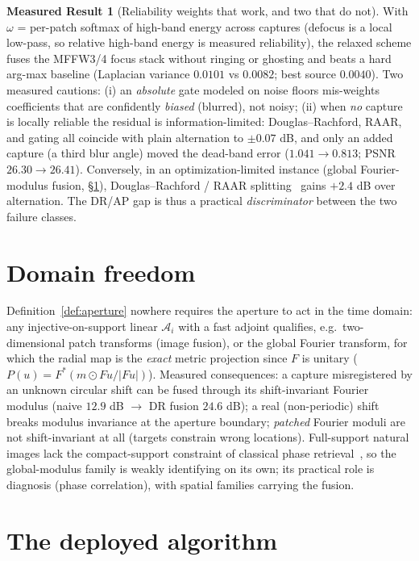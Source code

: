 \documentclass[11pt]{article}
\theoremstyle{definition}
\newtheorem{measured}[theorem]{Measured Result}
\newcommand{\cA}{\mathcal{A}}
\newcommand{\abs}[1]{\lvert #1\rvert}
\begin{document}
\begin{measured}[Reliability weights that work, and two that do not]
With $\omega$ = per-patch softmax of high-band energy across captures
(defocus is a local low-pass, so relative high-band energy is measured
reliability), the relaxed scheme fuses the MFFW3/4 focus stack without
ringing or ghosting and beats a hard arg-max baseline
(Laplacian variance $0.0101$ vs $0.0082$; best source $0.0040$).
Two measured cautions: (i) an \emph{absolute} gate modeled on noise floors
mis-weights coefficients that are confidently \emph{biased} (blurred), not
noisy; (ii) when \emph{no} capture is locally reliable the residual is
information-limited: Douglas--Rachford, RAAR, and gating all coincide with
plain alternation to $\pm0.07$ dB, and only an added capture (a third blur
angle) moved the dead-band error ($1.041\to0.813$; PSNR $26.30\to26.41$).
Conversely, in an optimization-limited instance (global Fourier-modulus
fusion, \S\ref{sec:domains}), Douglas--Rachford / RAAR
splitting~\cite{luke2005} gains $+2.4$ dB over alternation.  The DR/AP gap
is thus a practical \emph{discriminator} between the two failure classes.
\end{measured}

\section{Domain freedom}\label{sec:domains}

Definition~\ref{def:aperture} nowhere requires the aperture to act in the
time domain: any injective-on-support linear $\cA_i$ with a fast adjoint
qualifies, e.g.\ two-dimensional patch transforms (image fusion), or the
global Fourier transform, for which the radial map is the \emph{exact}
metric projection since $F$ is unitary
($P(u)=F^{*}(m\odot Fu/\abs{Fu})$).  Measured consequences: a
capture misregistered by an unknown circular shift can be fused through
its shift-invariant Fourier modulus (naive $12.9$ dB $\to$ DR fusion
$24.6$ dB); a real (non-periodic) shift breaks modulus invariance at the
aperture boundary; \emph{patched} Fourier moduli are not shift-invariant at
all (targets constrain wrong locations).  Full-support natural images lack
the compact-support constraint of classical phase
retrieval~\cite{fienup1982}, so the global-modulus family is weakly
identifying on its own; its practical role is diagnosis (phase
correlation), with spatial families carrying the fusion.

\section{The deployed algorithm}\label{sec:algorithm}
\end{document}
